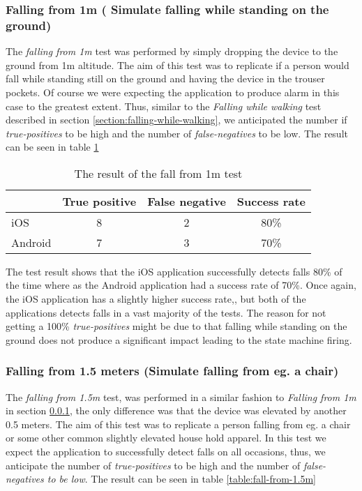 \documentclass[12pt, a4paper, onecolumn]{article}
\begin{document}
		
		\subsubsection{Falling  from 1m ( Simulate falling while standing on the ground)}
		\label{section:falling-from-1m}
		The  \textit{falling from 1m} test was performed by simply dropping the device to the ground from 1m altitude. The aim of this test was to replicate if a person would fall while standing still on the ground and having the device in the trouser pockets. Of course we were expecting the application to produce alarm in this case to the greatest extent. Thus, similar to the \textit{Falling while walking} test described in section \ref{section:falling-while-walking}, we anticipated the number if \textit{true-positives} to be high and the number of \textit{false-negatives} to be low. The result can be seen in table \ref{table:fall-from-1m}
		
			\begin{table}[H]
				\centering
				\begin{tabular}{|l|c|c|c|}
					\hline
					& True positive & False negative & Success rate \\ \hline
					iOS     & 8            & 2             & 80\%        \\ \hline
					Android & 7            & 3              & 70\%        \\ \hline
				\end{tabular}
				\caption{The result of the fall from 1m test}
				\label{table:fall-from-1m}
			\end{table}
	
		The test result shows that the iOS application successfully detects falls 80\% of the time where as the Android application had a success rate of 70\%. Once again, the iOS application has a slightly higher success rate,, but both of the applications detects falls in a vast majority of the tests. The reason for not getting a 100\% \textit{true-positives} might be due to that falling while standing on the ground does not produce a significant impact leading to the state machine firing.
		
		\subsubsection{Falling from 1.5 meters (Simulate falling from eg. a chair)}
		\label{section:falling-from-1.5m}
		The \textit{falling from 1.5m} test, was performed in a similar fashion to \textit{Falling from 1m} in section \ref{section:falling-from-1m}, the only difference was that the device was elevated by another 0.5 meters. The aim of this test was to replicate a person falling from eg. a chair or some other common slightly elevated house hold apparel. In this test we expect the application to successfully detect falls on all occasions, thus, we anticipate the number of \textit{true-positives} to be high and the number of \textit{false-negatives to be low}. The result can be seen in table \ref{table:fall-from-1.5m}
		
\end{document}
